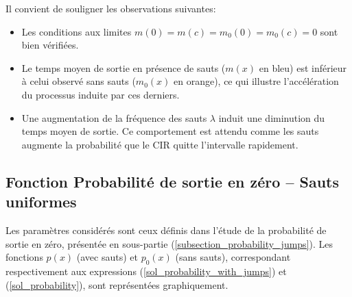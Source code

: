 Il convient de souligner les observations suivantes:
\begin{itemize}
    \item Les conditions aux limites \( m(0) = m(c) = m_0(0) = m_0(c) = 0 \) sont bien vérifiées.
    \item Le temps moyen de sortie en présence de sauts ($m(x)$ en bleu) est inférieur à celui observé sans sauts ($m_0(x)$ en orange), ce qui illustre l'accélération du processus induite par ces derniers.
    \item Une augmentation de la fréquence des sauts $\lambda$ induit une diminution du temps moyen de sortie. Ce comportement est attendu comme les sauts augmente la probabilité que le \acs{CIR} quitte l'intervalle rapidement.
\end{itemize}

\subsection{Fonction Probabilité de sortie en zéro -- Sauts uniformes}
Les paramètres considérés sont ceux définis dans l'étude de la probabilité de sortie en zéro, présentée en sous-partie (\ref{subsection_probability_jumps}). Les fonctions \( p(x) \) (avec sauts) et \( p_0(x) \) (sans sauts), correspondant respectivement aux expressions (\ref{sol_probability_with_jumps}) et (\ref{sol_probability}), sont représentées graphiquement.
